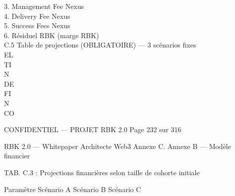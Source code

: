 \vspace{0.5em}
\vspace{0.5em}
3. Management Fee Nexus\\
\vspace{0.5em}
4. Delivery Fee Nexus\\
\vspace{0.5em}
5. Success Fees Nexus\\
\vspace{0.5em}
6. Résiduel RBK (marge RBK)\\
\vspace{0.5em}
\vspace{0.5em}
\vspace{0.5em}
C.5 Table de projections (OBLIGATOIRE) — 3 scénarios fixes\\
\vspace{0.5em}
\vspace{0.5em}
\vspace{0.5em}
\vspace{0.5em}
EL\\
TI\\
N\\
DE\\
FI\\
N\\
CO\\
\vspace{0.5em}
\vspace{0.5em}
\vspace{0.5em}
\vspace{0.5em}
\begin{confidential}CONFIDENTIEL — PROJET RBK 2.0               Page 232 sur 316\end{confidential}
RBK 2.0 — Whitepaper Architecte Web3                                                                            Annexe C. Annexe B — Modèle financier\\
\vspace{0.5em}
\vspace{0.5em}
\vspace{0.5em}
\vspace{0.5em}
\begin{center}\begin{tabular}TAB. C.3 : Projections financières selon taille de cohorte initiale\end{tabular}\end{center}
\vspace{0.5em}
\vspace{0.5em}
Paramètre                          Scénario A       Scénario B    Scénario C\\
